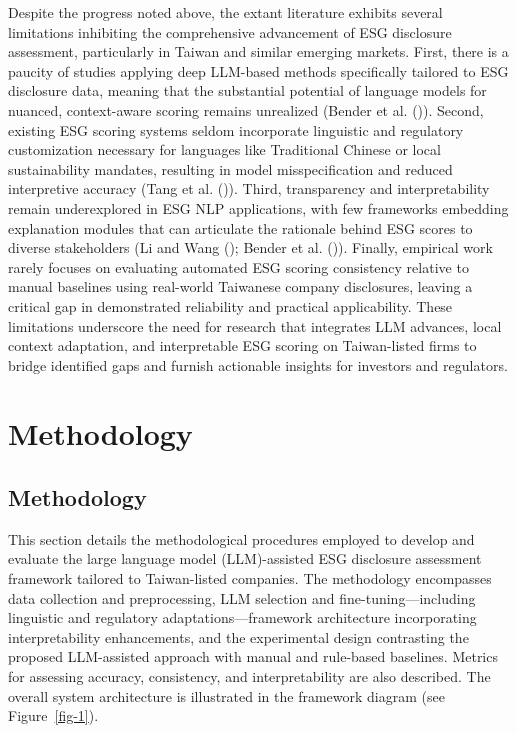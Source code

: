 \documentclass[
  12pt,
]{article}
\begin{document}
Despite the progress noted above, the extant literature exhibits several
limitations inhibiting the comprehensive advancement of ESG disclosure
assessment, particularly in Taiwan and similar emerging markets. First,
there is a paucity of studies applying deep LLM-based methods
specifically tailored to ESG disclosure data, meaning that the
substantial potential of language models for nuanced, context-aware
scoring remains unrealized (Bender et al.
()). Second, existing ESG scoring systems
seldom incorporate linguistic and regulatory customization necessary for
languages like Traditional Chinese or local sustainability mandates,
resulting in model misspecification and reduced interpretive accuracy
(Tang et al. ()). Third, transparency and
interpretability remain underexplored in ESG NLP applications, with few
frameworks embedding explanation modules that can articulate the
rationale behind ESG scores to diverse stakeholders (Li and Wang
(); Bender et al.
()). Finally, empirical work rarely
focuses on evaluating automated ESG scoring consistency relative to
manual baselines using real-world Taiwanese company disclosures, leaving
a critical gap in demonstrated reliability and practical applicability.
These limitations underscore the need for research that integrates LLM
advances, local context adaptation, and interpretable ESG scoring on
Taiwan-listed firms to bridge identified gaps and furnish actionable
insights for investors and regulators.

\section{Methodology}\label{methodology}

\subsection{Methodology}\label{methodology-1}

This section details the methodological procedures employed to develop
and evaluate the large language model (LLM)-assisted ESG disclosure
assessment framework tailored to Taiwan-listed companies. The
methodology encompasses data collection and preprocessing, LLM selection
and fine-tuning---including linguistic and regulatory
adaptations---framework architecture incorporating interpretability
enhancements, and the experimental design contrasting the proposed
LLM-assisted approach with manual and rule-based baselines. Metrics for
assessing accuracy, consistency, and interpretability are also
described. The overall system architecture is illustrated in the
framework diagram (see Figure~\ref{fig-1}).
\end{document}
